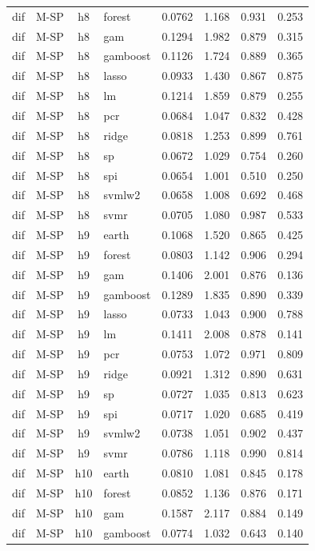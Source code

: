 \begin{ThreePartTable}
\begin{longtable}[t]{llclcccc}
dif & M-SP & h8 & forest & 0.0762 & 1.168 & 0.931 & 0.253\\
dif & M-SP & h8 & gam & 0.1294 & 1.982 & 0.879 & 0.315\\
dif & M-SP & h8 & gamboost & 0.1126 & 1.724 & 0.889 & 0.365\\
dif & M-SP & h8 & lasso & 0.0933 & 1.430 & 0.867 & 0.875\\
dif & M-SP & h8 & lm & 0.1214 & 1.859 & 0.879 & 0.255\\
dif & M-SP & h8 & pcr & 0.0684 & 1.047 & 0.832 & 0.428\\
dif & M-SP & h8 & ridge & 0.0818 & 1.253 & 0.899 & 0.761\\
dif & M-SP & h8 & sp & 0.0672 & 1.029 & 0.754 & 0.260\\
dif & M-SP & h8 & spi & 0.0654 & 1.001 & 0.510 & 0.250\\
dif & M-SP & h8 & svmlw2 & 0.0658 & 1.008 & 0.692 & 0.468\\
dif & M-SP & h8 & svmr & 0.0705 & 1.080 & 0.987 & 0.533\\
\addlinespace
dif & M-SP & h9 & earth & 0.1068 & 1.520 & 0.865 & 0.425\\
dif & M-SP & h9 & forest & 0.0803 & 1.142 & 0.906 & 0.294\\
dif & M-SP & h9 & gam & 0.1406 & 2.001 & 0.876 & 0.136\\
dif & M-SP & h9 & gamboost & 0.1289 & 1.835 & 0.890 & 0.339\\
dif & M-SP & h9 & lasso & 0.0733 & 1.043 & 0.900 & 0.788\\
dif & M-SP & h9 & lm & 0.1411 & 2.008 & 0.878 & 0.141\\
dif & M-SP & h9 & pcr & 0.0753 & 1.072 & 0.971 & 0.809\\
dif & M-SP & h9 & ridge & 0.0921 & 1.312 & 0.890 & 0.631\\
dif & M-SP & h9 & sp & 0.0727 & 1.035 & 0.813 & 0.623\\
dif & M-SP & h9 & spi & 0.0717 & 1.020 & 0.685 & 0.419\\
dif & M-SP & h9 & svmlw2 & 0.0738 & 1.051 & 0.902 & 0.437\\
dif & M-SP & h9 & svmr & 0.0786 & 1.118 & 0.990 & 0.814\\
\addlinespace
dif & M-SP & h10 & earth & 0.0810 & 1.081 & 0.845 & 0.178\\
dif & M-SP & h10 & forest & 0.0852 & 1.136 & 0.876 & 0.171\\
dif & M-SP & h10 & gam & 0.1587 & 2.117 & 0.884 & 0.149\\
dif & M-SP & h10 & gamboost & 0.0774 & 1.032 & 0.643 & 0.140\\

\end{longtable}
\end{ThreePartTable}
